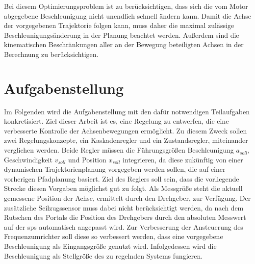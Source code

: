 Bei diesem Optimierungsproblem ist zu berücksichtigen, dass sich die vom Motor abgegebene Beschleunigung nicht unendlich schnell ändern kann. Damit die Achse der vorgegebenen Trajektorie folgen kann, muss daher die maximal zulässige Beschleunigungsänderung in der Planung beachtet werden. Außerdem sind die kinematischen Beschränkungen aller an der Bewegung beteiligten Achsen in der Berechnung zu berücksichtigen.


\section{Aufgabenstellung}
\label{sec:aufgabenstellung}
Im Folgenden wird die Aufgabenstellung mit den dafür notwendigen Teilaufgaben konkretisiert. Ziel dieser Arbeit ist es, eine Regelung zu entwerfen, die eine verbesserte Kontrolle der Achsenbewegungen ermöglicht. Zu diesem Zweck sollen zwei Regelungskonzepte, ein Kaskadenregler und ein Zustandsregler, miteinander verglichen werden. Beide Regler müssen die Führungsgrößen Beschleunigung $a_{soll}$,  Geschwindigkeit $v_{soll}$ und Position $x_{soll}$ 
integrieren, da diese zukünftig von einer dynamischen Trajektorienplanung vorgegeben werden sollen, die auf einer vorherigen Pfadplanung basiert. Ziel des Reglers soll sein, dass die vorliegende Strecke diesen Vorgaben möglichst gut zu folgt. Als Messgröße steht die aktuell gemessene Position der Achse, ermittelt durch den Drehgeber, zur Verfügung. Der zusätzliche Seilzugssensor muss dabei nicht berücksichtigt werden, da nach dem Rutschen des Portals die Position des Drehgebers durch den absoluten Messwert auf der \ac{sps} automatisch angepasst wird.
Zur Verbesserung der Ansteuerung des Frequenzumrichter soll diese so verbessert werden, dass eine vorgegebene Beschleunigung als Eingangsgröße genutzt wird. Infolgedessen wird die Beschleunigung als Stellgröße des zu regelnden Systems fungieren.\\
\\
